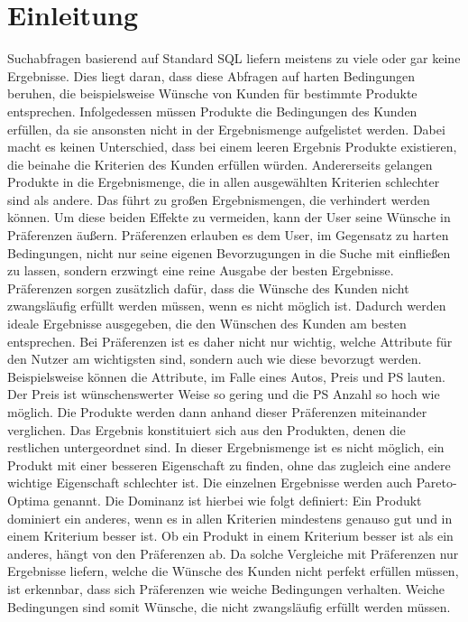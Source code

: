\chapter{Einleitung}
\label{ch:Einleitung}
Suchabfragen basierend auf Standard SQL liefern meistens zu viele oder gar keine Ergebnisse.  Dies liegt daran, dass diese Abfragen auf harten Bedingungen beruhen, die beispielsweise Wünsche von Kunden für bestimmte Produkte entsprechen. Infolgedessen müssen Produkte die Bedingungen des Kunden erfüllen, da sie ansonsten nicht in der Ergebnismenge aufgelistet werden. Dabei macht es keinen Unterschied, dass bei einem leeren Ergebnis Produkte existieren, die beinahe die Kriterien des Kunden erfüllen würden. Andererseits gelangen Produkte in die Ergebnismenge, die in allen ausgewählten Kriterien schlechter sind als andere. Das führt zu großen Ergebnismengen, die verhindert werden können. Um diese beiden Effekte zu vermeiden, kann der User seine Wünsche in Präferenzen äußern. Präferenzen erlauben es dem User, im Gegensatz zu harten Bedingungen, nicht nur seine eigenen Bevorzugungen in die Suche mit einfließen zu lassen, sondern erzwingt eine reine Ausgabe der besten Ergebnisse. Präferenzen sorgen zusätzlich dafür, dass die Wünsche des Kunden nicht zwangsläufig erfüllt werden müssen, wenn es nicht möglich ist. Dadurch werden ideale Ergebnisse ausgegeben, die den Wünschen des Kunden am besten entsprechen.
Bei Präferenzen ist es daher nicht nur wichtig, welche Attribute für den Nutzer am wichtigsten sind, sondern auch wie diese bevorzugt werden. Beispielsweise können die Attribute, im Falle eines Autos, Preis und PS lauten. Der Preis ist wünschenswerter Weise so gering und die PS Anzahl so hoch wie möglich.
Die Produkte werden dann anhand dieser Präferenzen miteinander verglichen. Das Ergebnis konstituiert sich aus den  Produkten, denen die restlichen untergeordnet sind. In dieser Ergebnismenge ist es nicht möglich, ein Produkt mit einer besseren Eigenschaft zu finden, ohne das zugleich eine andere wichtige Eigenschaft schlechter ist. Die einzelnen Ergebnisse werden auch Pareto-Optima genannt. Die Dominanz ist hierbei wie folgt definiert: Ein Produkt dominiert ein anderes, wenn es in allen Kriterien mindestens genauso gut und in einem Kriterium besser ist. Ob ein Produkt in einem Kriterium besser ist als ein anderes, hängt von den Präferenzen ab. Da solche Vergleiche mit Präferenzen nur Ergebnisse liefern, welche die Wünsche des Kunden nicht perfekt erfüllen müssen, ist erkennbar, dass sich Präferenzen wie weiche Bedingungen verhalten. Weiche Bedingungen sind somit Wünsche, die nicht zwangsläufig erfüllt werden müssen.
